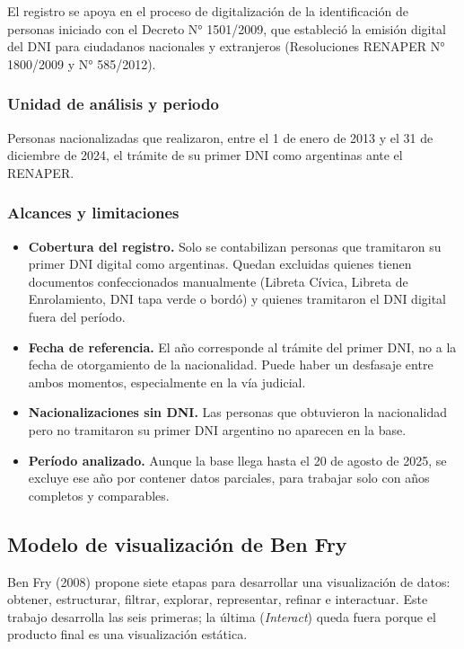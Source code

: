 \documentclass[
  letterpaper,
  DIV=11,
  numbers=noendperiod]{scrartcl}
\providecommand{\tightlist}{%
  \setlength{\itemsep}{0pt}\setlength{\parskip}{0pt}}\usepackage{longtable,booktabs,array}
\begin{document}
El registro se apoya en el proceso de digitalización de la
identificación de personas iniciado con el Decreto N° 1501/2009, que
estableció la emisión digital del DNI para ciudadanos nacionales y
extranjeros (Resoluciones RENAPER N° 1800/2009 y N° 585/2012).

\subsubsection{Unidad de análisis y
periodo}\label{unidad-de-anuxe1lisis-y-periodo}

Personas nacionalizadas que realizaron, entre el 1 de enero de 2013 y el
31 de diciembre de 2024, el trámite de su primer DNI como argentinas
ante el RENAPER.

\subsubsection{Alcances y limitaciones}\label{alcances-y-limitaciones}

\begin{itemize}
\tightlist
\item
  \textbf{Cobertura del registro.} Solo se contabilizan personas que
  tramitaron su primer DNI digital como argentinas. Quedan excluidas
  quienes tienen documentos confeccionados manualmente (Libreta Cívica,
  Libreta de Enrolamiento, DNI tapa verde o bordó) y quienes tramitaron
  el DNI digital fuera del período.
\item
  \textbf{Fecha de referencia.} El año corresponde al trámite del primer
  DNI, no a la fecha de otorgamiento de la nacionalidad. Puede haber un
  desfasaje entre ambos momentos, especialmente en la vía judicial.
\item
  \textbf{Nacionalizaciones sin DNI.} Las personas que obtuvieron la
  nacionalidad pero no tramitaron su primer DNI argentino no aparecen en
  la base.
\item
  \textbf{Período analizado.} Aunque la base llega hasta el 20 de agosto
  de 2025, se excluye ese año por contener datos parciales, para
  trabajar solo con años completos y comparables.
\end{itemize}

\subsection{Modelo de visualización de Ben
Fry}\label{modelo-de-visualizaciuxf3n-de-ben-fry}

Ben Fry (2008) propone siete etapas para desarrollar una visualización
de datos: obtener, estructurar, filtrar, explorar, representar, refinar
e interactuar. Este trabajo desarrolla las seis primeras; la última
(\emph{Interact}) queda fuera porque el producto final es una
visualización estática.
\end{document}
